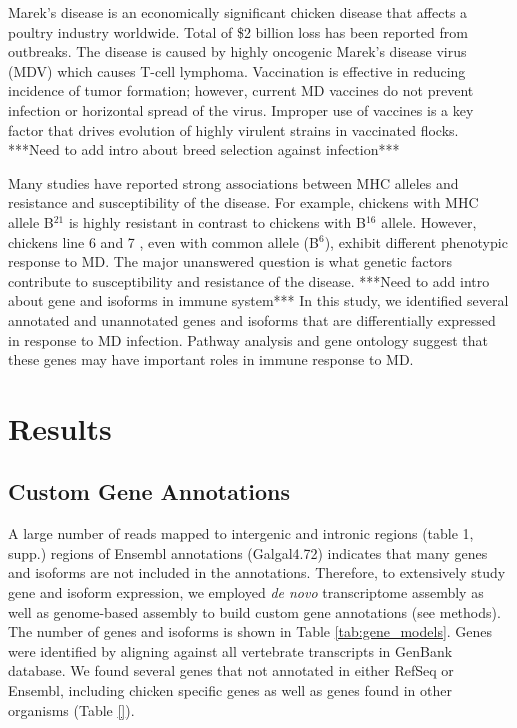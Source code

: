 \documentclass[10pt]{article}
\begin{document}
Marek's disease is an economically significant chicken disease that affects a poultry industry worldwide.
Total of \$2 billion loss has been reported from outbreaks.
The disease is caused by highly oncogenic Marek's disease virus (MDV) which causes T-cell lymphoma.
Vaccination is effective in reducing incidence of tumor formation; however, current MD vaccines do not
prevent infection or horizontal spread of the virus.
Improper use of vaccines is a key factor that drives evolution of highly virulent strains in vaccinated
flocks.
***Need to add intro about breed selection against infection***

Many studies have reported strong associations between MHC alleles and resistance and susceptibility of
the disease. For example, chickens with MHC allele B$^{21}$ is highly resistant in contrast to chickens with
B$^{16}$ allele.
However, chickens line 6 and 7 , even with common allele (B$^6$), exhibit different phenotypic response to
MD.
The major unanswered question is what genetic factors contribute to susceptibility and resistance of
the disease.
***Need to add intro about gene and isoforms in immune system***
In this study, we identified several annotated and unannotated genes and isoforms that are differentially
expressed in response to MD infection. Pathway analysis and gene ontology suggest that these
genes may have important roles in immune response to MD.


\section*{Results}

\subsection*{Custom Gene Annotations}
A large number of reads mapped to intergenic and intronic regions (table 1, supp.)
regions of Ensembl annotations (Galgal4.72)
indicates that many genes and isoforms are not included in the annotations.
Therefore, to extensively study gene and isoform expression, we employed \emph{de novo}
transcriptome assembly as well as genome-based assembly to build custom gene annotations (see methods).
The number of genes and isoforms is shown in Table \ref{tab:gene_models}.
Genes were identified by aligning against all vertebrate transcripts in GenBank database.
We found several genes that not annotated in either RefSeq or Ensembl, including chicken specific genes
as well as genes found in other organisms (Table \ref{}).
\end{document}
